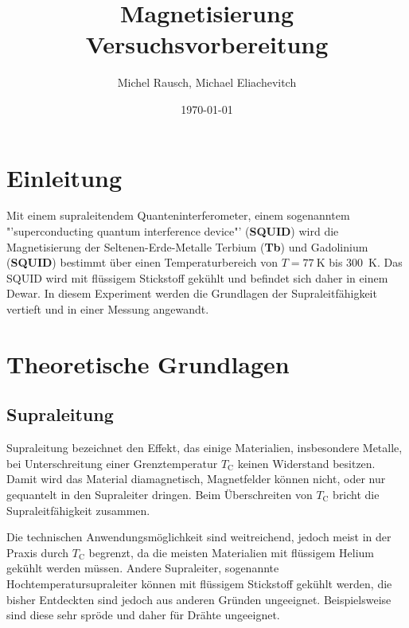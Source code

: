 \documentclass[a4paper,ngerman]{scrartcl}
\title{Magnetisierung\\Versuchsvorbereitung}
\date{\today}
\author{Michel Rausch, Michael Eliachevitch}
\begin{document}
\maketitle
\tableofcontents
\newpage

\section{Einleitung}


Mit einem supraleitendem Quanteninterferometer, einem sogenanntem "'superconducting quantum interference device"' (\textbf{SQUID}) wird die Magnetisierung der Seltenen-Erde-Metalle Terbium (\textbf{Tb}) und Gadolinium (\textbf{SQUID}) bestimmt über einen Temperaturbereich von $T= \SI{77}{\kelvin} $ bis \SI{300}{\kelvin}.
Das SQUID wird mit flüssigem Stickstoff gekühlt und befindet sich daher in einem Dewar. 
In diesem Experiment werden die Grundlagen der Supraleitfähigkeit vertieft und in einer Messung angewandt.


\section{Theoretische Grundlagen}

\subsection{Supraleitung}

Supraleitung bezeichnet den Effekt, das einige Materialien, insbesondere Metalle, bei Unterschreitung einer Grenztemperatur $T_{\mathrm{C}}$ keinen Widerstand besitzen. 
Damit wird das Material diamagnetisch, Magnetfelder können nicht, oder nur gequantelt in den Supraleiter dringen. 
Beim Überschreiten von $T_{\mathrm{C}}$ bricht die Supraleitfähigkeit zusammen. 

Die technischen Anwendungsmöglichkeit sind weitreichend, jedoch meist in der Praxis durch $T_{\mathrm{C}}$ begrenzt, da die meisten Materialien mit flüssigem Helium gekühlt werden müssen. 
Andere Supraleiter, sogenannte Hochtemperatursupraleiter können mit flüssigem Stickstoff gekühlt werden, die bisher Entdeckten sind jedoch aus anderen Gründen ungeeignet.
Beispielsweise sind diese sehr spröde und daher für Drähte ungeeignet.
\end{document}
